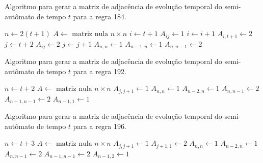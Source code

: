 \documentclass[12pt,a4paper]{article}
\begin{document}
\begin{algorithm}[H]
\caption{Algoritmo para gerar a matriz de adjacência de evolução temporal do
semi-autômato de tempo $t$ para a regra 184.}
\label{alg:r184}
\begin{algorithmic}
\STATE $n \leftarrow 2(t+1)$
\STATE $A \leftarrow \mbox{ matriz nula } n \times n$
\STATE $i \leftarrow t+1$
    \STATE $A_{ij} \leftarrow 1$
    \STATE $i \leftarrow i+1$
\ENDFOR
{}
    \STATE $A_{i,t+1} \leftarrow 2$
\ENDFOR
\STATE $j \leftarrow t+2$
    \STATE $A_{ij} \leftarrow 2$
    \STATE $j \leftarrow j+1$
\ENDFOR
\STATE $A_{n,n} \leftarrow 1$
\STATE $A_{n-1,n} \leftarrow 1$
\STATE $A_{n,n-1} \leftarrow 2$
\end{algorithmic}
\end{algorithm}

\begin{algorithm}[H]
\caption{Algoritmo para gerar a matriz de adjacência de evolução temporal do
semi-autômato de tempo $t$ para a regra 192.}
\label{alg:r192}
\begin{algorithmic}
\STATE $n \leftarrow t+2$
\STATE $A \leftarrow \mbox{ matriz nula } n \times n$
    \STATE $A_{j,j+1} \leftarrow 1$
\ENDFOR
\STATE $A_{n,n} \leftarrow 1$
\STATE $A_{n-2,n} \leftarrow 1$
\STATE $A_{n,n-1} \leftarrow 2$
\STATE $A_{n-1,n-1} \leftarrow 2$
\STATE $A_{n-1,1} \leftarrow 1$
\end{algorithmic}
\end{algorithm}

\begin{algorithm}[H]
\caption{Algoritmo para gerar a matriz de adjacência de evolução temporal do
semi-autômato de tempo $t$ para a regra 196.}
\label{alg:r196}
\begin{algorithmic}
\STATE $n \leftarrow t+3$
\STATE $A \leftarrow \mbox{ matriz nula } n \times n$
    \STATE $A_{j,j+1} \leftarrow 1$
    \STATE $A_{j+1,1} \leftarrow 2$
\ENDFOR
\STATE $A_{n,n} \leftarrow 1$
\STATE $A_{n-2,n} \leftarrow 1$
\STATE $A_{n,n-1} \leftarrow 2$
\STATE $A_{n-1,n-1} \leftarrow 2$
\STATE $A_{n-1,2} \leftarrow 1$
\end{algorithmic}
\end{algorithm}
\end{document}
